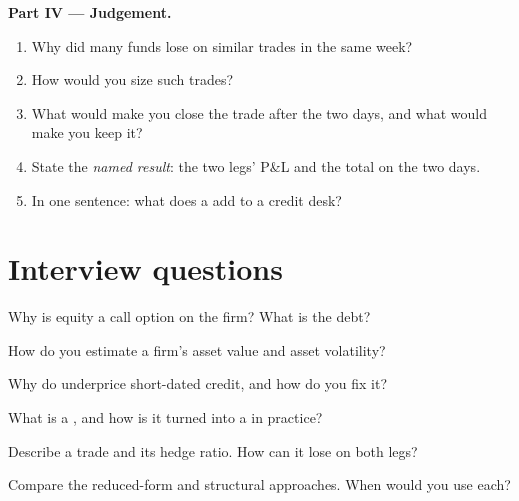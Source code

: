 \begin{problem}
\medskip\noindent\textbf{Part IV --- Judgement.}
\begin{enumerate}[resume]
\item Why did many funds lose on similar trades in the same week?
\item How would you size such trades?
\item What would make you close the trade after the two days, and what would make you
keep it?
\item State the \emph{named result}: the two legs' P\&L and the total on the two days.
\item In one sentence: what does a  add to a credit desk?
\end{enumerate}
\end{problem}

\section{Interview questions}

\begin{interviewq}\label{iq:rc:structural-credit-models:1}
Why is equity a call option on the firm? What is the debt?
\end{interviewq}

\begin{interviewq}\label{iq:rc:structural-credit-models:2}
How do you estimate a firm's asset value and asset volatility?
\end{interviewq}

\begin{interviewq}\label{iq:rc:structural-credit-models:3}
Why do  underprice short-dated credit, and how do you fix it?
\end{interviewq}

\begin{interviewq}\label{iq:rc:structural-credit-models:4}
What is a , and how is it turned into a  in
practice?
\end{interviewq}

\begin{interviewq}\label{iq:rc:structural-credit-models:5}
Describe a  trade and its hedge ratio. How can it lose on
both legs?
\end{interviewq}

\begin{interviewq}\label{iq:rc:structural-credit-models:6}
Compare the reduced-form and structural approaches. When would you use each?
\end{interviewq}
